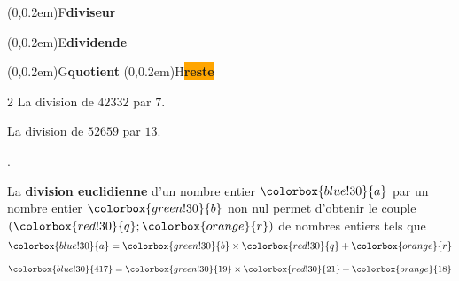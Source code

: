 \begin{changemargin}{-10mm}{-10mm}
\begin{exemples*1}
\begin{minipage}{0.5\linewidth}
\begin{center}
				\qquad
				\begin{minipage}[b]{2cm}
					\pnode(0,0.2em){F}{\colorbox{green!30}{\textbf{diviseur}}}
						\par
					\pnode(0,0.2em){E}{\colorbox{blue!30}{\textbf{dividende}}}
					\par
					\pnode(0,0.2em){G}{\colorbox{red!30}{\textbf{quotient}}}
					\pnode(0,0.2em){H}{\colorbox{orange}{\textbf{reste}}}
				\end{minipage}
			\end{center}
		\end{minipage}

		\par\smallskip
		\begin{multicols}2
			La division de $\num{42332}$ par $7$.\par\smallskip
			\begin{center}
			\end{center}
			\columnbreak
			La division de $\num{52659}$ par $13$.\par\smallskip
			\begin{center}
				.
			\end{center}
		\end{multicols}
	\end{exemples*1}

	\begin{propriete}[\admise]
		La \textbf{division euclidienne} d'un nombre entier $\colorbox{blue!30}{a}$ par un nombre entier $\colorbox{green!30}{b}$ non nul 
		permet d'obtenir le couple $(\colorbox{red!30}{q};\colorbox{orange}{r})$ de nombres entiers tels que
		$$\colorbox{blue!30}{a}=\colorbox{green!30}{b}\times \colorbox{red!30}{q}+ \colorbox{orange}{r}$$
	\end{propriete}

	\begin{exemple*1}
		$\colorbox{blue!30}{417}=\colorbox{green!30}{19}\times \colorbox{red!30}{21}+ \colorbox{orange}{18}$
	\end{exemple*1}


\end{changemargin}
